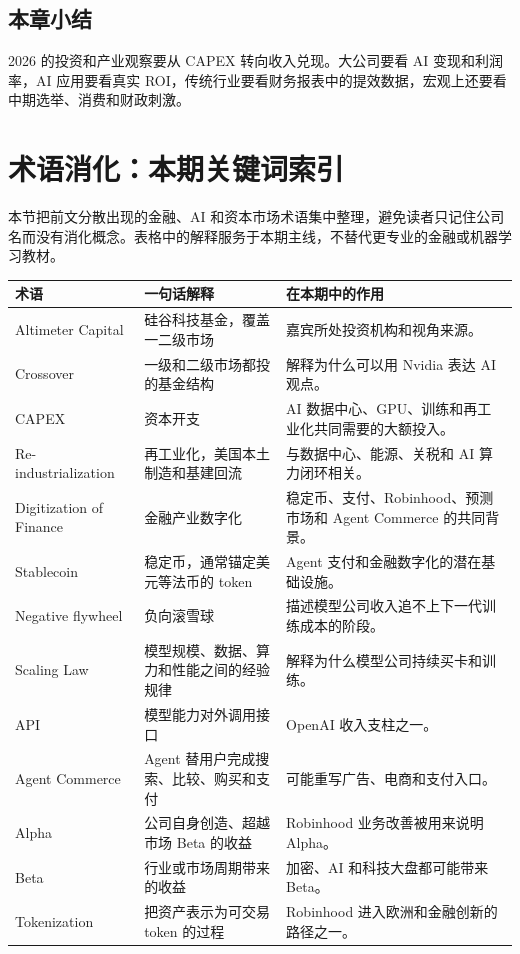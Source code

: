 \documentclass[a4paper]{article}
\begin{document}
\subsection{本章小结}

2026 的投资和产业观察要从 CAPEX 转向收入兑现。大公司要看 AI 变现和利润率，AI 应用要看真实 ROI，传统行业要看财务报表中的提效数据，宏观上还要看中期选举、消费和财政刺激。

\section{术语消化：本期关键词索引}

本节把前文分散出现的金融、AI 和资本市场术语集中整理，避免读者只记住公司名而没有消化概念。表格中的解释服务于本期主线，不替代更专业的金融或机器学习教材。

\begin{longtable}{p{}p{}p{}}
\toprule
术语 & 一句话解释 & 在本期中的作用 \\
\midrule
Altimeter Capital & 硅谷科技基金，覆盖一二级市场 & 嘉宾所处投资机构和视角来源。 \\
Crossover & 一级和二级市场都投的基金结构 & 解释为什么可以用 Nvidia 表达 AI 观点。 \\
CAPEX & 资本开支 & AI 数据中心、GPU、训练和再工业化共同需要的大额投入。 \\
Re-industrialization & 再工业化，美国本土制造和基建回流 & 与数据中心、能源、关税和 AI 算力闭环相关。 \\
Digitization of Finance & 金融产业数字化 & 稳定币、支付、Robinhood、预测市场和 Agent Commerce 的共同背景。 \\
Stablecoin & 稳定币，通常锚定美元等法币的 token & Agent 支付和金融数字化的潜在基础设施。 \\
Negative flywheel & 负向滚雪球 & 描述模型公司收入追不上下一代训练成本的阶段。 \\
Scaling Law & 模型规模、数据、算力和性能之间的经验规律 & 解释为什么模型公司持续买卡和训练。 \\
API & 模型能力对外调用接口 & OpenAI 收入支柱之一。 \\
Agent Commerce & Agent 替用户完成搜索、比较、购买和支付 & 可能重写广告、电商和支付入口。 \\
Alpha & 公司自身创造、超越市场 Beta 的收益 & Robinhood 业务改善被用来说明 Alpha。 \\
Beta & 行业或市场周期带来的收益 & 加密、AI 和科技大盘都可能带来 Beta。 \\
Tokenization & 把资产表示为可交易 token 的过程 & Robinhood 进入欧洲和金融创新的路径之一。 \\

\end{longtable}
\end{document}
